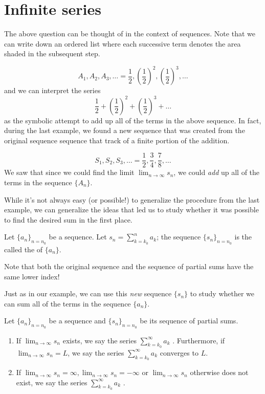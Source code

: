 \documentclass{ximera}
\begin{document}
\section{Infinite series}
The above question can be thought of in the context of sequences.  Note that we can write down an ordered list where each successive term denotes the area shaded in the subsequent step.

\[
A_1, A_2,A_3, \ldots = \frac{1}{2},\left(\frac{1}{2}\right)^2,\left(\frac{1}{2}\right)^3,\ldots
\]
and we can interpret the series $$\frac{1}{2} + \left(\frac{1}{2}\right)^2+ \left(\frac{1}{2}\right)^3+ \ldots$$ as the symbolic attempt to add up all of the terms in the above sequence.  In fact, during the last example, we found a new sequence that was created from the original sequence sequence that track of a finite portion of the addition.

\[
S_1, S_2,S_3, \ldots = \frac{1}{2},\frac{3}{4},\frac{7}{8},\ldots
\]
We saw that since we could find the limit $\lim_{n \to \infty} s_n$, we could \emph{add} up all of the terms in the sequence $\{A_n\}$.  

While it's not always easy (or possible!) to generalize the procedure from the last example, we can generalize the ideas that led us to study whether it was possible to find the desired sum in the first place.

\begin{definition}
Let $\{a_n\}_{n=n_0}$ be a sequence.  Let $s_n = \sum_{k=k_0}^n a_k$; the sequence $\{s_n\}_{n=n_0}$ is the called the
   of $\{a_n\}$.  
\end{definition}

Note that both the original sequence and the sequence of partial sums have the same lower index!

Just as in our example, we can use this \emph{new} sequence $\{s_n\}$ to study whether we can sum all of the terms in the sequence $\{a_n\}$.



\begin{definition}
Let $\{a_n\}_{n=n_0}$ be a sequence and $\{s_n\}_{n=n_0}$ be its sequence of partial sums.

\begin{enumerate}
\item If $\lim_{n\to\infty} s_n$ exists, we say the series
  $\sum_{k=k_0}^\infty a_k$ .  Furthermore, if $\lim_{n\to\infty} s_n =L$, we say the series
  $\sum_{k=k_0}^\infty a_k$ converges to $L$. 
\item If $\lim_{n\to\infty} s_n = \infty, \lim_{n\to\infty} s_n = -\infty$ or $\lim_{n\to\infty} s_n $ otherwise does not exist, we say the series
  $\sum_{k=k_0}^\infty a_k$ .  
\end{enumerate}
\end{definition}
\end{document}
